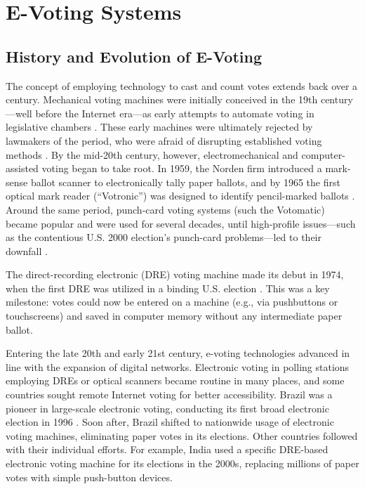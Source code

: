 \documentclass[a4paper,10pt]{report}
\begin{document}
 \section{E-Voting Systems}

 \subsection{History and Evolution of E-Voting}

The concept of employing technology to cast and count votes extends back over a century.  Mechanical voting machines were initially conceived in the 19th century—well before the Internet era—as early attempts to automate voting in legislative chambers \cite{aceproject}.  These early machines were ultimately rejected by lawmakers of the period, who were afraid of disrupting established voting methods \cite{aceproject}.  By the mid-20th century, however, electromechanical and computer-assisted voting began to take root.  In 1959, the Norden firm introduced a mark-sense ballot scanner to electronically tally paper ballots, and by 1965 the first optical mark reader (“Votronic”) was designed to identify pencil-marked ballots \cite{aceproject}.  Around the same period, punch-card voting systems (such the Votomatic) became popular and were used for several decades, until high-profile issues—such as the contentious U.S. 2000 election’s punch-card problems—led to their downfall \cite{aceproject}.

 The direct-recording electronic (DRE) voting machine made its debut in 1974, when the first DRE was utilized in a binding U.S. election \cite{aceproject}.  This was a key milestone: votes could now be entered on a machine (e.g., via pushbuttons or touchscreens) and saved in computer memory without any intermediate paper ballot.

 Entering the late 20th and early 21st century, e-voting technologies advanced in line with the expansion of digital networks.  Electronic voting in polling stations employing DREs or optical scanners became routine in many places, and some countries sought remote Internet voting for better accessibility.  Brazil was a pioneer in large-scale electronic voting, conducting its first broad electronic election in 1996 \cite{aceeeo}.  Soon after, Brazil shifted to nationwide usage of electronic voting machines, eliminating paper votes in its elections.  Other countries followed with their individual efforts.  For example, India used a specific DRE-based electronic voting machine for its elections in the 2000s, replacing millions of paper votes with simple push-button devices.
\end{document}
